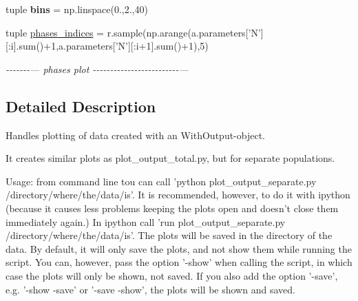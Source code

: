 \begin{DoxyCompactItemize}
\item 
\hypertarget{namespaceplot__output__separate_a0e50cb28cc4b3b88a1bbdd3fbd7a62f9}{tuple {\bfseries bins} = np.\-linspace(0.,2.,40)}\label{namespaceplot__output__separate_a0e50cb28cc4b3b88a1bbdd3fbd7a62f9}

\item 
\hypertarget{namespaceplot__output__separate_aa0d6727a27e70d79c2fa08343ec891af}{tuple \hyperlink{namespaceplot__output__separate_aa0d6727a27e70d79c2fa08343ec891af}{phases\-\_\-indices} = r.\-sample(np.\-arange(a.\-parameters\mbox{[}'N'\mbox{]}\mbox{[}\-:i\mbox{]}.sum()+1,a.\-parameters\mbox{[}'N'\mbox{]}\mbox{[}\-:i+1\mbox{]}.sum()+1),5)}\label{namespaceplot__output__separate_aa0d6727a27e70d79c2fa08343ec891af}

\begin{DoxyCompactList}\small\item\em -\/-\/-\/-\/-\/-\/-\/--- phases plot -\/-\/-\/-\/-\/-\/-\/-\/-\/-\/-\/-\/-\/-\/-\/-\/-\/-\/-\/-\/-\/-\/-\/-\/-\/--- \end{DoxyCompactList}\end{DoxyCompactItemize}


\subsection{Detailed Description}
\begin{DoxyVerb}Handles plotting of data created with an WithOutput-object.

It creates similar plots as plot_output_total.py, but for separate populations.

Usage: from command line tou can call 'python plot_output_separate.py /directory/where/the/data/is'.
It is recommended, however, to do it with ipython (because it causes less problems keeping the 
plots open and doesn't close them immediately again.)
In ipython call 'run plot_output_separate.py /directory/where/the/data/is'.
The plots will be saved in the directory of the data.
By default, it will only save the plots, and not show them while running the script.
You can, however, pass the option '-show' when calling the script,
in which case the plots will only be shown, not saved.
If you also add the option '-save', e.g. '-show -save' or '-save -show',
the plots will be shown and saved. 
\end{DoxyVerb}
 